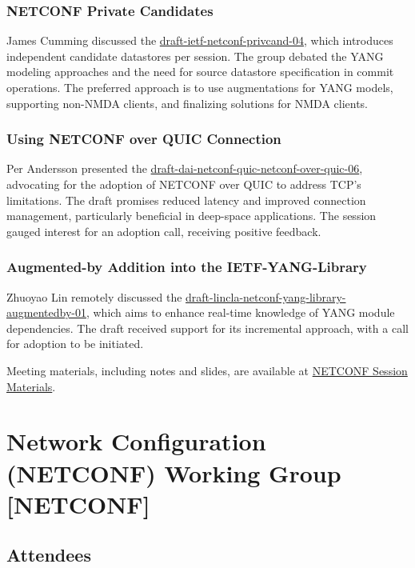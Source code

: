 \documentclass{article}
\begin{document}
\subsubsection{NETCONF Private Candidates}
James Cumming discussed the \href{https://datatracker.ietf.org/doc/html/draft-ietf-netconf-privcand-04}{draft-ietf-netconf-privcand-04}, which introduces independent candidate datastores per session. The group debated the YANG modeling approaches and the need for source datastore specification in commit operations. The preferred approach is to use augmentations for YANG models, supporting non-NMDA clients, and finalizing solutions for NMDA clients.

\subsubsection{Using NETCONF over QUIC Connection}
Per Andersson presented the \href{https://datatracker.ietf.org/doc/html/draft-dai-netconf-quic-netconf-over-quic-06}{draft-dai-netconf-quic-netconf-over-quic-06}, advocating for the adoption of NETCONF over QUIC to address TCP's limitations. The draft promises reduced latency and improved connection management, particularly beneficial in deep-space applications. The session gauged interest for an adoption call, receiving positive feedback.

\subsubsection{Augmented-by Addition into the IETF-YANG-Library}
Zhuoyao Lin remotely discussed the \href{https://datatracker.ietf.org/doc/html/draft-lincla-netconf-yang-library-augmentedby-01}{draft-lincla-netconf-yang-library-augmentedby-01}, which aims to enhance real-time knowledge of YANG module dependencies. The draft received support for its incremental approach, with a call for adoption to be initiated.

Meeting materials, including notes and slides, are available at \href{https://datatracker.ietf.org/meeting/120/session/netconf}{NETCONF Session Materials}.



\newpage

\section{Network Configuration (NETCONF) Working Group [NETCONF]}

\subsection{Attendees}
\end{document}

